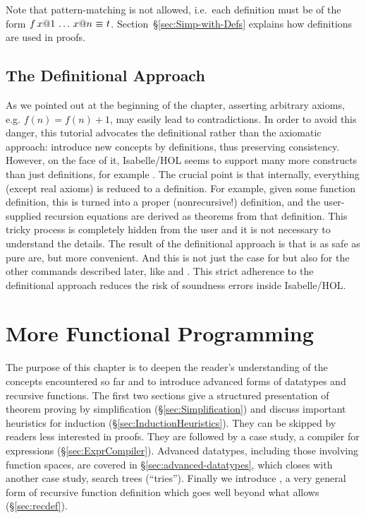 Note that pattern-matching is not allowed, i.e.\ each definition must be of
the form $f\,x@1\,\dots\,x@n~\emph{$\equiv$}~t$.
Section~{\S}\ref{sec:Simp-with-Defs} explains how definitions are used
in proofs.






\section{The Definitional Approach}
\label{sec:definitional}

As we pointed out at the beginning of the chapter, asserting arbitrary
axioms, e.g. $f(n) = f(n) + 1$, may easily lead to contradictions. In order
to avoid this danger, this tutorial advocates the definitional rather than
the axiomatic approach: introduce new concepts by definitions, thus
preserving consistency. However, on the face of it, Isabelle/HOL seems to
support many more constructs than just definitions, for example
. The crucial point is that internally, everything
(except real axioms) is reduced to a definition. For example, given some
 function definition, this is turned into a proper
(nonrecursive!) definition, and the user-supplied recursion equations are
derived as theorems from that definition. This tricky process is completely
hidden from the user and it is not necessary to understand the details. The
result of the definitional approach is that  is as safe
as pure  are, but more convenient. And this is not just the
case for  but also for the other commands described
later, like  and .
This strict adherence to the definitional approach reduces the risk of 
soundness errors inside Isabelle/HOL.

\chapter{More Functional Programming}

The purpose of this chapter is to deepen the reader's understanding of the
concepts encountered so far and to introduce advanced forms of datatypes and
recursive functions. The first two sections give a structured presentation of
theorem proving by simplification ({\S}\ref{sec:Simplification}) and discuss
important heuristics for induction ({\S}\ref{sec:InductionHeuristics}). They can
be skipped by readers less interested in proofs. They are followed by a case
study, a compiler for expressions ({\S}\ref{sec:ExprCompiler}). Advanced
datatypes, including those involving function spaces, are covered in
{\S}\ref{sec:advanced-datatypes}, which closes with another case study, search
trees (``tries'').  Finally we introduce , a very general
form of recursive function definition which goes well beyond what
 allows ({\S}\ref{sec:recdef}).


